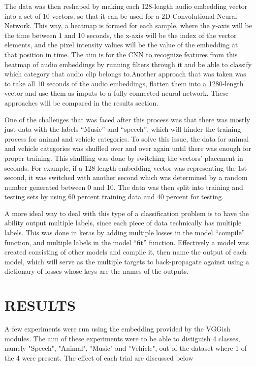 \documentclass[journal]{IEEEtran}
\begin{document}
The data was then reshaped by making each 128-length audio embedding vector into a set of 10 vectors, so that it can be used for a 2D Convolutional Neural Network. This way, a heatmap is formed for each sample, where the y-axis will be the time between 1 and 10 seconds, the x-axis will be the index of the vector elements, and the pixel intensity values will be the value of the embedding at that position in time. The aim is for the CNN to recognize features from this heatmap of audio embeddings by running filters through it and be able to classify which category that audio clip belongs to.Another approach that was taken was to take all 10 seconds of the audio embeddings, flatten them into a 1280-length vector and use them as imputs to a fully connected neural network. These approaches will be compared in the results section.

One of the challenges that was faced after this process was that there was mostly just data with the labels “Music” and “speech”, which will hinder the training process for animal and vehicle categories. To solve this issue, the data for animal and vehicle categories was shuffled over and over again until there was enough for proper training. This shuffling was done by switching the vectors’ placement in seconds. For example, if a 128 length embedding vector was representing the 1st second, it was switched with another second which was determined by a random number generated between 0 and 10. The data was then split into training and testing sets by using 60 percent training data and 40 percent for testing.

A more ideal way to deal with this type of a classification problem is to have the ability output multiple labels, since each piece of data technically has multiple labels. This was done in keras by adding multiple losses in the model “compile” function, and multiple labels in the model “fit” function. Effectively a model was created consisting of other models and compile it, then name the output of each model, which will serve as the multiple targets to back-propagate against using a dictionary of losses whose keys are the names of the outputs.

\section{RESULTS}

A few experiments were run using the embedding provided by the VGGish modules. The aim of these experiments were to be able to distiguish 4 classes, namely "Speech", "Animal", "Music" and "Vehicle", out of the dataset where 1 of the 4 were present. The effect of each trial are discussed below
\end{document}
